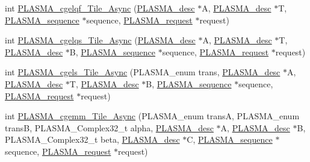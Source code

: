 \begin{DoxyCompactItemize}
\item 
int \hyperlink{group__PLASMA__Complex32__t__Tile__Async_gaaacea3fd379ed855b4223aa763dd0cc1_gaaacea3fd379ed855b4223aa763dd0cc1}{P\+L\+A\+S\+M\+A\+\_\+cgelqf\+\_\+\+Tile\+\_\+\+Async} (\hyperlink{structplasma__desc__t}{P\+L\+A\+S\+M\+A\+\_\+desc} $\ast$A, \hyperlink{structplasma__desc__t}{P\+L\+A\+S\+M\+A\+\_\+desc} $\ast$T, \hyperlink{structplasma__sequence__t}{P\+L\+A\+S\+M\+A\+\_\+sequence} $\ast$sequence, \hyperlink{structplasma__request__t}{P\+L\+A\+S\+M\+A\+\_\+request} $\ast$request)
\item 
int \hyperlink{group__PLASMA__Complex32__t__Tile__Async_gaf0c1cbccdaaa9731b193bf271b58fdb9_gaf0c1cbccdaaa9731b193bf271b58fdb9}{P\+L\+A\+S\+M\+A\+\_\+cgelqs\+\_\+\+Tile\+\_\+\+Async} (\hyperlink{structplasma__desc__t}{P\+L\+A\+S\+M\+A\+\_\+desc} $\ast$A, \hyperlink{structplasma__desc__t}{P\+L\+A\+S\+M\+A\+\_\+desc} $\ast$T, \hyperlink{structplasma__desc__t}{P\+L\+A\+S\+M\+A\+\_\+desc} $\ast$B, \hyperlink{structplasma__sequence__t}{P\+L\+A\+S\+M\+A\+\_\+sequence} $\ast$sequence, \hyperlink{structplasma__request__t}{P\+L\+A\+S\+M\+A\+\_\+request} $\ast$request)
\item 
int \hyperlink{group__PLASMA__Complex32__t__Tile__Async_ga7a7704d98d5c0dbebe99aecdad6f9106_ga7a7704d98d5c0dbebe99aecdad6f9106}{P\+L\+A\+S\+M\+A\+\_\+cgels\+\_\+\+Tile\+\_\+\+Async} (P\+L\+A\+S\+M\+A\+\_\+enum trans, \hyperlink{structplasma__desc__t}{P\+L\+A\+S\+M\+A\+\_\+desc} $\ast$A, \hyperlink{structplasma__desc__t}{P\+L\+A\+S\+M\+A\+\_\+desc} $\ast$T, \hyperlink{structplasma__desc__t}{P\+L\+A\+S\+M\+A\+\_\+desc} $\ast$B, \hyperlink{structplasma__sequence__t}{P\+L\+A\+S\+M\+A\+\_\+sequence} $\ast$sequence, \hyperlink{structplasma__request__t}{P\+L\+A\+S\+M\+A\+\_\+request} $\ast$request)
\item 
int \hyperlink{group__PLASMA__Complex32__t__Tile__Async_gac1eaf46f34d5d6eb0c86fba31c4e291d_gac1eaf46f34d5d6eb0c86fba31c4e291d}{P\+L\+A\+S\+M\+A\+\_\+cgemm\+\_\+\+Tile\+\_\+\+Async} (P\+L\+A\+S\+M\+A\+\_\+enum trans\+A, P\+L\+A\+S\+M\+A\+\_\+enum trans\+B, P\+L\+A\+S\+M\+A\+\_\+\+Complex32\+\_\+t alpha, \hyperlink{structplasma__desc__t}{P\+L\+A\+S\+M\+A\+\_\+desc} $\ast$A, \hyperlink{structplasma__desc__t}{P\+L\+A\+S\+M\+A\+\_\+desc} $\ast$B, P\+L\+A\+S\+M\+A\+\_\+\+Complex32\+\_\+t beta, \hyperlink{structplasma__desc__t}{P\+L\+A\+S\+M\+A\+\_\+desc} $\ast$C, \hyperlink{structplasma__sequence__t}{P\+L\+A\+S\+M\+A\+\_\+sequence} $\ast$sequence, \hyperlink{structplasma__request__t}{P\+L\+A\+S\+M\+A\+\_\+request} $\ast$request)
\item 

\end{DoxyCompactItemize}
